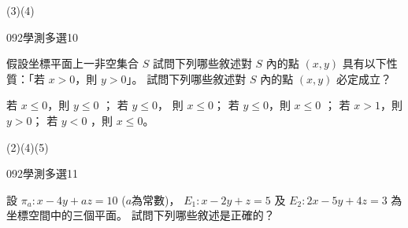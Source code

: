\begin{QUESTIONS}
\begin{QUESTION}
        \begin{QANS}
            (3)(4)
        \end{QANS}
        \begin{QSOLLIST}
        \end{QSOLLIST}
        \begin{QEMPTYSPACE}
        \end{QEMPTYSPACE}
    \end{QUESTION}
    \begin{QUESTION}
        \begin{ExamInfo}{092}{學測}{多選}{10}
        \end{ExamInfo}
        \begin{ExamAnsRateInfo}{21}{43}{14}{6}
        \end{ExamAnsRateInfo}
        \begin{QBODY}
            假設坐標平面上一非空集合 $S$ 試問下列哪些敘述對 $S$ 內的點 $(x, y)$ 具有以下性質：「若  $x > 0$，則 $y > 0$」。 試問下列哪些敘述對 $S$ 內的點 $(x, y)$ 必定成立？ 
            \begin{QOPS} 
                \QOP 若 $x \leq 0$，則 $y \leq 0$ ；
                \QOP 若 $y \leq 0$， 則 $x \leq 0$；
                \QOP 若 $y \leq 0$，則 $x \leq 0$ ； 
                \QOP 若 $x >1$，則 $y>0$；  \QOP 若 $y<0$ ，則 $x \leq 0$。
            \end{QOPS}
        \end{QBODY}
        \begin{QFROMS}
        \end{QFROMS}
        \begin{QTAGS}\end{QTAGS}
        \begin{QANS}
            (2)(4)(5)
        \end{QANS}
        \begin{QSOLLIST}
        \end{QSOLLIST}
        \begin{QEMPTYSPACE}
        \end{QEMPTYSPACE}
    \end{QUESTION}
    \begin{QUESTION}
        \begin{ExamInfo}{092}{學測}{多選}{11}
        \end{ExamInfo}
        \begin{ExamAnsRateInfo}{24}{43}{18}{11}
        \end{ExamAnsRateInfo}
        \begin{QBODY}
            設 $\pi_a : x-4y +az=10$ ($a$為常數)， $E_1 :x-2y+z=5$ 及 $E_2  :2x-5y+4z=3$ 為坐標空間中的三個平面。
            試問下列哪些敘述是正確的？
            

\end{QBODY}
\end{QUESTION}
\end{QUESTIONS}
